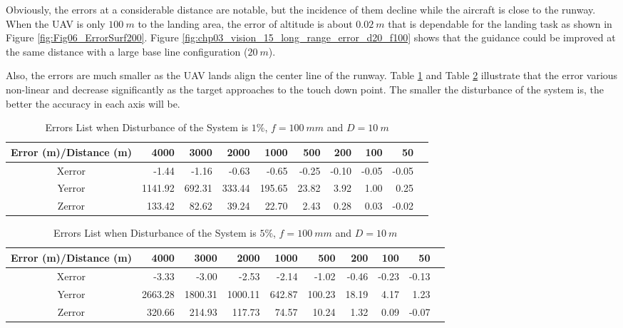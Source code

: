 \documentclass[journal,article,submit,moreauthors,pdftex,10pt,a4paper]{mdpi}
\begin{document}
Obviously, the errors at a considerable distance are notable, but the incidence of them decline while the aircraft is close to the runway. When the UAV is only $100\ m$ to the landing area, the error of altitude is about $0.02\ m$ that is dependable for the landing task as shown in Figure \ref{fig:Fig06_ErrorSurf200}. Figure \ref{fig:chp03_vision_15_long_range_error_d20_f100} shows that the guidance could be improved at the same distance with a large base line configuration ($20\ m$). 

Also, the errors are much smaller as the UAV lands align the center line of the runway. Table \ref{label:chp03_stereo_1} and Table \ref{label:chp03_stereo_2} illustrate that the error various non-linear and decrease significantly as the target approaches to the touch down point. The smaller the disturbance of the system is, the better the accuracy in each axis will be.

\begin{table}[t]
	\centering
	\caption{Errors List when Disturbance of the System is $1\%$, $f=100\ mm$ and $D=10\ m$}
	\label{label:chp03_stereo_1}
	\begin{tabular}{crrrrrrrrr}
		\hline
		Error (m)/Distance (m)     & 4000    & 3000   & 2000     & 1000  & 500   & 200   & 100   & 50     \\ \hline
		Xerror  & -1.44   & -1.16  & -0.63  & -0.65   & -0.25 & -0.10 & -0.05 & -0.05\\ 
		Yerror  & 1141.92 & 692.31 & 333.44 & 195.65  & 23.82 & 3.92  & 1.00  & 0.25   \\
		Zerror  & 133.42  & 82.62  & 39.24  & 22.70   & 2.43  & 0.28  & 0.03  & -0.02  \\ \hline		
	\end{tabular}
\end{table}

\begin{table}[t]
	\centering
	\caption{Errors List when Disturbance of the System is $5\%$, $f=100\ mm$ and $D=10\ m$}
	\label{label:chp03_stereo_2}
	\begin{tabular}{crrrrrrrrr}
		\hline
		Error (m)/Distance (m)     & 4000    & 3000    & 2000      & 1000  & 500    & 200   & 100   & 50    \\ \hline
		Xerror  & -3.33   & -3.00   & -2.53   & -2.14   & -1.02  & -0.46 & -0.23 & -0.13 \\ 
		Yerror & 2663.28 & 1800.31 & 1000.11 & 642.87  & 100.23 & 18.19 & 4.17  & 1.23  \\
		Zerror & 320.66  & 214.93  & 117.73  & 74.57   & 10.24  & 1.32  & 0.09  & -0.07 \\ \hline		
	\end{tabular}
\end{table}
\end{document}
